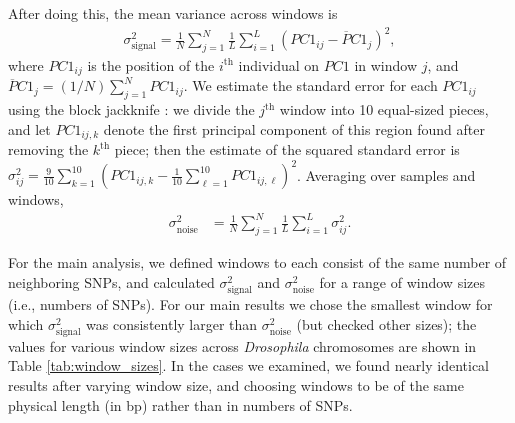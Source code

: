 \documentclass[11pt, oneside]{article}   	%
\newcommand\citep{\cite}
\newcommand{\pcone}{PC1}
\renewcommand{\revpoint}[2]{\relax}
\begin{document}
After doing this, the mean variance across windows is
\begin{align*}
    \sigma_\text{signal}^2
    = 
    \frac{1}{N} \sum_{j=1}^{N}
        \frac{1}{L}\sum_{i=1}^{L}\left ( \pcone_{ij} -\overline\pcone_{j} \right )^{2} ,
\end{align*}
where $\pcone_{ij}$ is the position of the $i^\text{th}$ individual on $\pcone$ in window $j$,
and $\overline\pcone_j = (1/N) \sum_{j=1}^N \pcone_{ij}$.
We estimate the standard error for each $\pcone_{ij}$ using the block jackknife \citep{efron1982jackknife,busing1999deletem}: %
we divide the $j^\text{th}$ window into 10 equal-sized pieces,
and let $\pcone_{ij,k}$ denote the first principal component of this region found after removing the $k^\text{th}$ piece;
then the estimate of the squared standard error is
$\sigma^2_{ij} = \frac{9}{10} \sum_{k=1}^{10} ( \pcone_{ij,k} - \frac{1}{10} \sum_{\ell=1}^{10} \pcone_{ij,\ell} )^2$.
Averaging over samples and windows,
\begin{align*}
    \sigma^2_\text{noise}
    &=
    \frac{1}{N} \sum_{j=1}^{N} \frac{1}{L}\sum_{i=1}^{L} \sigma^2_{ij} .
\end{align*}

For the main analysis, we defined windows to each consist of the same number of neighboring SNPs,
and calculated $\sigma^2_\text{signal}$ and $\sigma^2_\text{noise}$
for a range of window sizes (i.e., numbers of SNPs).
For our main results we
chose the smallest window for which $\sigma^2_\text{signal}$ was consistently larger than $\sigma^2_\text{noise}$ (but checked other sizes);
the values for various window sizes across \textit{Drosophila} chromosomes are shown in Table \ref{tab:window_sizes}.
In the cases we examined, we found nearly identical results after varying window size,
and choosing windows to be of the same physical length (in bp) rather than in numbers of SNPs.

\end{document}
